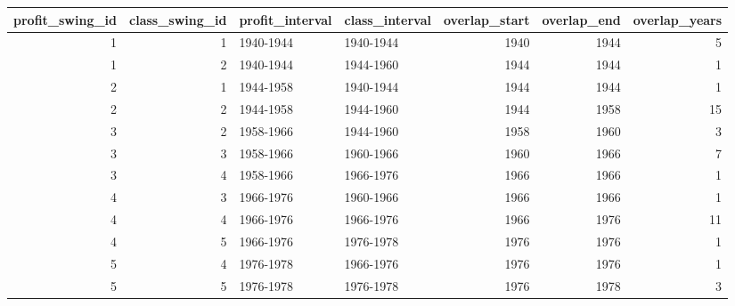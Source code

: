 
\begin{tabular}{rrllrrr}
\toprule
profit_swing_id & class_swing_id & profit_interval & class_interval & overlap_start & overlap_end & overlap_years\\
\midrule
1 & 1 & 1940-1944 & 1940-1944 & 1940 & 1944 & 5\\
1 & 2 & 1940-1944 & 1944-1960 & 1944 & 1944 & 1\\
2 & 1 & 1944-1958 & 1940-1944 & 1944 & 1944 & 1\\
2 & 2 & 1944-1958 & 1944-1960 & 1944 & 1958 & 15\\
3 & 2 & 1958-1966 & 1944-1960 & 1958 & 1960 & 3\\
3 & 3 & 1958-1966 & 1960-1966 & 1960 & 1966 & 7\\
3 & 4 & 1958-1966 & 1966-1976 & 1966 & 1966 & 1\\
4 & 3 & 1966-1976 & 1960-1966 & 1966 & 1966 & 1\\
4 & 4 & 1966-1976 & 1966-1976 & 1966 & 1976 & 11\\
4 & 5 & 1966-1976 & 1976-1978 & 1976 & 1976 & 1\\
5 & 4 & 1976-1978 & 1966-1976 & 1976 & 1976 & 1\\
5 & 5 & 1976-1978 & 1976-1978 & 1976 & 1978 & 3\\
\bottomrule
\end{tabular}
